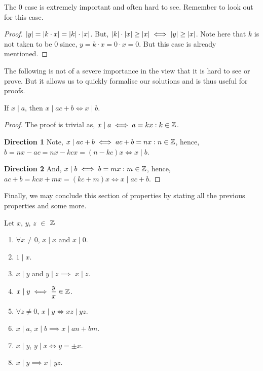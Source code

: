 The \(0\) case is extremely important and often hard to see. Remember to look out for this case.

\begin{proof}
	\(\abs{y}=\abs{k\cdot x}= \abs{k}\cdot \abs{x}\). But, \( \abs{k}\cdot \abs{x} \ge \abs{x} \iff \abs{y} \ge \abs{x}\). Note here that \(k\) is not taken to be \(0\) since, \(y=k\cdot x=0\cdot x=0\). But this case is already mentioned.
\end{proof}



The following is not of a severe importance in the view that it is hard to see or prove. But it allows us to quickly formalise our solutions and is thus useful for proofs.

\begin{lemma}
	\label{lem: unimp}
	If \(x \mid a\), then \(x \mid ac+b \iff x\mid b\).
\end{lemma}

\begin{proof}
	The proof is trivial as, \(x \mid a \iff a = kx : k \in \mathbb Z\).
	\par 
	\textbf{Direction 1}
	Note, \(x \mid ac+b \iff ac+b=nx : n \in \mathbb Z\), hence, \(b=nx-ac=nx-kcx=(n-kc)x \iff x \mid b\).
	\par
	\textbf{Direction 2}
	And, \(x\mid b \iff b=mx : m \in \mathbb Z \), hence, \(ac+b=kcx+mx=(kc+m)x \iff x \mid ac+b \).
\end{proof}

Finally, we may conclude this section of properties by stating all the previous properties and some more. 
\begin{theorem}
	Let \(x\), \(y\), \(z\) \(\in\) \(\mathbb Z\)
	\begin{enumerate}
		\item \(\forall x \ne 0\), \(x \mid x\) and \(x \mid 0\).
		\item \(1 \mid x\).
		\item \(x\mid y\) and \(y \mid z \implies \) \(x \mid z\).
		\item \(x \mid y \iff \dfrac{y}{x} \in \mathbb Z\).
		\item \(\forall z \ne 0\), \(x \mid y \iff xz \mid yz\). 
		\item \(x\mid a\), \(x\mid b \implies x\mid an+bm\).
		\item \(x\mid y\), \(y\mid x \iff y=\pm x\).
		\item \(x \mid y \implies x \mid yz\).
		
	\end{enumerate}
	
\end{theorem}

